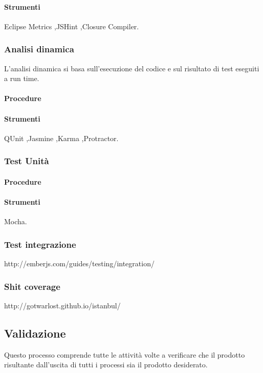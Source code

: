 \paragraph{Strumenti}
Eclipse Metrics ,JSHint ,Closure Compiler.

\subsubsection{Analisi dinamica}
L'analisi dinamica si basa sull'esecuzione del codice e sul risultato di test eseguiti a run time.
\paragraph{Procedure}

\paragraph{Strumenti}
QUnit ,Jasmine ,Karma ,Protractor.

\subsubsection{Test Unità}

\paragraph{Procedure}

\paragraph{Strumenti}
Mocha.

\subsubsection{Test integrazione}

http://emberjs.com/guides/testing/integration/

\subsubsection{Shit coverage}
http://gotwarlost.github.io/istanbul/



\subsection{Validazione}
Questo processo comprende tutte le attività volte a verificare che il prodotto risultante dall'uscita di tutti i processi sia il prodotto desiderato.

